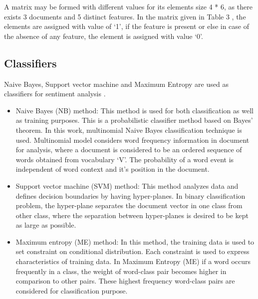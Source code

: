 \documentclass[10pt]{article}
\begin{document}
{\begin{enumerate}
A matrix may be formed with different values for its
elements size 4 * 6, as there exists 3 documents and
5 distinct features. In the matrix given in Table 3 ,
the elements are assigned with value of ‘1’, if the
feature is present or else in case of the absence of
any feature, the element is assigned with value ‘0’.

\end{enumerate}

\begin{comment}
\begin{figure}[!h]
\centering
\texttt{[image: arch1.png]}
\caption{Dual Sentiment Analysis System Architecture}
\end{figure}
\end{comment}
\subsection{Classifiers}
Naive Bayes, Support vector machine and Maximum Entropy are used as classifiers for sentiment analysis .

\begin{itemize}
 \item Naive Bayes (NB) method: This method is used for both classification as 
 well as training purposes. This is a probabilistic classifier method 
 based on Bayes’ theorem. In this work, multinomial Naive Bayes classification technique is used. Multinomial
model considers word frequency information in document for
analysis, where a document is considered to be an ordered 
sequence of words obtained from vocabulary ‘V’. The probability
of a word event is independent of word context and it’s position in the document.
\end{itemize}
\begin{itemize}
\item Support vector machine (SVM) method: This method analyzes
data and defines decision boundaries by having hyper-planes.
In binary classification problem, the hyper-plane separates the
document vector in one class from other class, where the separation between hyper-planes is desired to be kept as large as
possible.
\end{itemize}
\begin{itemize}
\item Maximum entropy (ME) method: In this method, the training
data is used to set constraint on conditional distribution. Each constraint is used to 
express characteristics of training data. In Maximum Entropy (ME)
if a word occurs frequently in a class,
the weight of word-class pair becomes higher in comparison to
other pairs. These highest frequency word-class pairs are 
considered for classification purpose.
\end{itemize}

}
\end{document}
